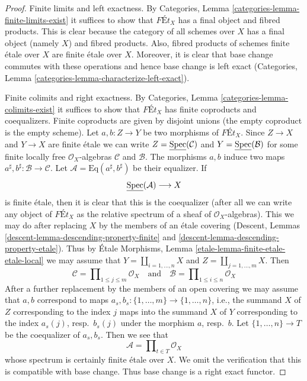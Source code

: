 \begin{proof}
Finite limits and left exactness. By
Categories, Lemma \ref{categories-lemma-finite-limits-exist}
it suffices to show that $\textit{F\'Et}_X$ has a final object
and fibred products. This is clear because the category of
all schemes over $X$ has a final object (namely $X$) and fibred products.
Also, fibred products of schemes finite \'etale over $X$ are
finite \'etale over $X$. Moreover, it is clear that base
change commutes with these operations and hence base change
is left exact (Categories, Lemma
\ref{categories-lemma-characterize-left-exact}).

\medskip\noindent
Finite colimits and right exactness. By
Categories, Lemma \ref{categories-lemma-colimits-exist}
it suffices to show that $\textit{F\'Et}_X$ has finite
coproducts and coequalizers. Finite coproducts are given
by disjoint unions (the empty coproduct is the empty scheme).
Let $a, b : Z \to Y$ be two morphisms of $\textit{F\'Et}_X$.
Since $Z \to X$ and $Y \to X$ are finite \'etale we can write
$Z = \underline{\mathop{\mathrm{Spec}}}(\mathcal{C})$ and $Y = \underline{\mathop{\mathrm{Spec}}}(\mathcal{B})$
for some finite locally free $\mathcal{O}_X$-algebras $\mathcal{C}$
and $\mathcal{B}$. The morphisms $a, b$ induce two maps
$a^\sharp, b^\sharp : \mathcal{B} \to \mathcal{C}$.
Let $\mathcal{A} = \text{Eq}(a^\sharp, b^\sharp)$ be their
equalizer. If
$$
\underline{\mathop{\mathrm{Spec}}}(\mathcal{A}) \longrightarrow X
$$
is finite \'etale, then it is clear that this is the coequalizer
(after all we can write any object of $\textit{F\'Et}_X$
as the relative spectrum of a sheaf of $\mathcal{O}_X$-algebras).
This we may do after replacing $X$ by the members of an \'etale
covering (Descent, Lemmas \ref{descent-lemma-descending-property-finite}
and \ref{descent-lemma-descending-property-etale}).
Thus by \'Etale Morphisms, Lemma \ref{etale-lemma-finite-etale-etale-local}
we may assume that
$Y = \coprod_{i = 1, \ldots, n} X$ and $Z = \coprod_{j = 1, \ldots, m} X$.
Then
$$
\mathcal{C} = \prod\nolimits_{1 \leq j \leq m} \mathcal{O}_X
\quad\text{and}\quad
\mathcal{B} = \prod\nolimits_{1 \leq i \leq n} \mathcal{O}_X
$$
After a further replacement by the members of an open covering
we may assume that $a, b$ correspond to
maps $a_s, b_s : \{1, \ldots, m\} \to \{1, \ldots, n\}$, i.e.,
the summand $X$ of $Z$ corresponding to the index $j$ maps into
the summand $X$ of $Y$ corresponding to the index $a_s(j)$, resp.\ $b_s(j)$
under the morphism $a$, resp.\ $b$.
Let $\{1, \ldots, n\} \to T$ be the coequalizer of $a_s, b_s$.
Then we see that
$$
\mathcal{A} = \prod\nolimits_{t \in T} \mathcal{O}_X
$$
whose spectrum is certainly finite \'etale over $X$. We
omit the verification that this is compatible with base change.
Thus base change is a right exact functor.
\end{proof}

